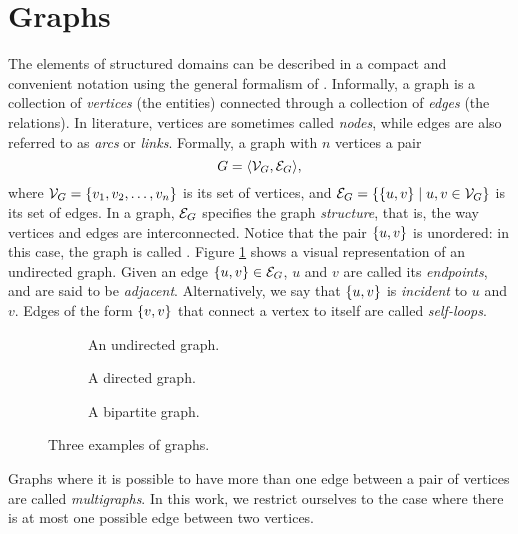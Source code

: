 \section{Graphs}\label{sec:graphs}
The elements of structured domains can be described in a compact and convenient notation using the general formalism of . Informally, a graph is a collection of \emph{vertices} (the entities) connected through a collection of \emph{edges} (the relations). In literature, vertices are sometimes called \emph{nodes}, while edges are also referred to as \emph{arcs} or \emph{links}. Formally, a graph with $n$ vertices a pair
$$G =\langle \Cal{V}_G, \Cal{E}_G \rangle,$$
where $\Cal{V}_G = \Set{v_1, v_2, \ldots, v_n}$ is its set of vertices, and $\Cal{E}_G = \{\{u, v\} \mid u, v \in \Cal{V}_G\}$ is its set of edges. In a graph, $\Cal{E}_G$  specifies the graph \emph{structure}, that is, the way vertices and edges are interconnected. Notice that the pair $\{ u,v \}$ is unordered: in this case, the graph is called . Figure \ref{fig:undirected-graph} shows a visual representation of an undirected graph.
Given an edge $\Set{u, v} \in \Cal{E}_G$, $u$ and $v$ are called its \emph{endpoints}, and are said to be \emph{adjacent}. Alternatively, we say that $\{ u, v \}$ is \emph{incident} to $u$ and $v$. Edges of the form $\{ v,v \}$ that connect a vertex to itself are called \emph{self-loops}.
\begin{figure*}
    \begin{subfigure}[b]{0.38\linewidth}
        \centering
        \resizebox{.8\textwidth}{!}{}
        \caption{An undirected graph.}
        \label{fig:undirected-graph}
    \end{subfigure}
    \begin{subfigure}[b]{0.32\linewidth}
        \centering
        \resizebox{.8\textwidth}{!}{}
        \caption{A directed graph.}
        \label{fig:directed-graph}
    \end{subfigure}
    \begin{subfigure}[b]{0.25\linewidth}
        \centering
        \resizebox{.9\textwidth}{!}{}
        \caption{A bipartite graph.}
        \label{fig:bipartite-graph}
    \end{subfigure}
    \caption{Three examples of graphs.}
\end{figure*}
Graphs where it is possible to have more than one edge between a pair of vertices are called \emph{multigraphs}. In this work, we restrict ourselves to the case where there is at most one possible edge between two vertices.

